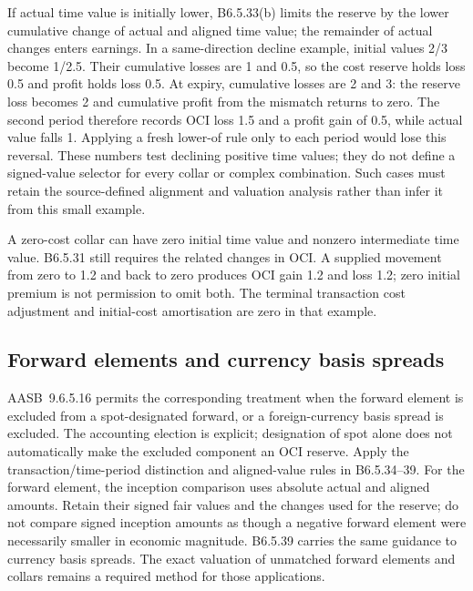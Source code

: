 If actual time value is initially lower, B6.5.33(b) limits the reserve by the lower cumulative change of actual and aligned time value; the remainder of actual changes enters earnings. In a same-direction decline example, initial values 2/3 become 1/2.5. Their cumulative losses are 1 and 0.5, so the cost reserve holds loss 0.5 and profit holds loss 0.5. At expiry, cumulative losses are 2 and 3: the reserve loss becomes 2 and cumulative profit from the mismatch returns to zero. The second period therefore records OCI loss 1.5 and a profit gain of 0.5, while actual value falls 1. Applying a fresh lower-of rule only to each period would lose this reversal. These numbers test declining positive time values; they do not define a signed-value selector for every collar or complex combination. Such cases must retain the source-defined alignment and valuation analysis rather than infer it from this small example.

A zero-cost collar can have zero initial time value and nonzero intermediate time value. B6.5.31 still requires the related changes in OCI. A supplied movement from zero to 1.2 and back to zero produces OCI gain 1.2 and loss 1.2; zero initial premium is not permission to omit both. The terminal transaction cost adjustment and initial-cost amortisation are zero in that example.

\hypertarget{forward-elements-and-currency-basis-spreads}{%
\subsection{Forward elements and currency basis spreads}\label{forward-elements-and-currency-basis-spreads}}

AASB~9.6.5.16 \citep[6.5.16 and B6.5.34--39]{aasb9dated} permits the corresponding treatment when the forward element is excluded from a spot-designated forward, or a foreign-currency basis spread is excluded. The accounting election is explicit; designation of spot alone does not automatically make the excluded component an OCI reserve. Apply the transaction/time-period distinction and aligned-value rules in B6.5.34--39. For the forward element, the inception comparison uses absolute actual and aligned amounts. Retain their signed fair values and the changes used for the reserve; do not compare signed inception amounts as though a negative forward element were necessarily smaller in economic magnitude. B6.5.39 carries the same guidance to currency basis spreads. The exact valuation of unmatched forward elements and collars remains a required method for those applications.

